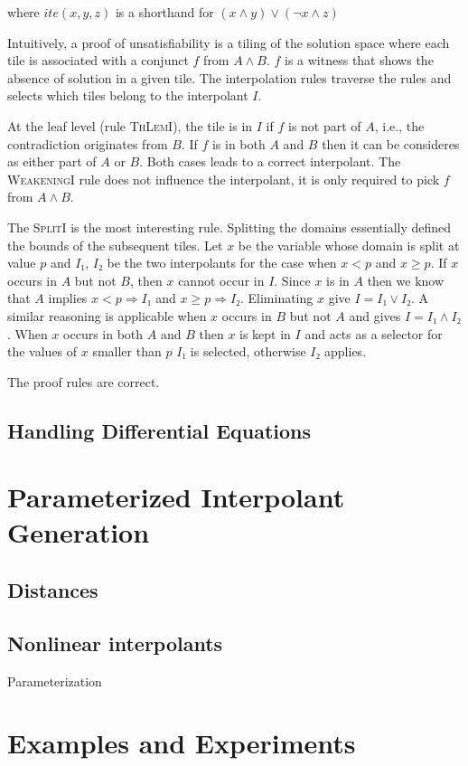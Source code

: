 \documentclass{llncs}
\begin{document}
where $ite(x,y,z)$ is a shorthand for $(x ∧ y)∨(¬x ∧ z)$


Intuitively, a proof of unsatisfiability is a tiling of the solution space where each tile is associated with a conjunct $f$ from $A ∧ B$.
$f$ is a witness that shows the absence of solution in a given tile.
The interpolation rules traverse the rules and selects which tiles belong to the interpolant $I$.

At the leaf level (rule \textsc{ThLemI}), the tile is in $I$ if $f$ is not part of $A$, i.e., the contradiction originates from $B$.
If $f$ is in both $A$ and $B$ then it can be consideres as either part of $A$ or $B$.
Both cases leads to a correct interpolant.
The \textsc{WeakeningI} rule does not influence the interpolant, it is only required to pick $f$ from $A ∧ B$.

The \textsc{SplitI} is the most interesting rule.
Splitting the domains essentially defined the bounds of the subsequent tiles.
Let $x$ be the variable whose domain is split at value $p$ and $I₁$, $I₂$ be the two interpolants for the case when $x < p$ and $x ≥ p$.
If $x$ occurs in $A$ but not $B$, then $x$ cannot occur in $I$.
Since $x$ is in $A$ then we know that $A$ implies $x < p ⇒ I₁$ and $x ≥ p ⇒ I₂$.
Eliminating $x$ give $I = I₁ ∨ I₂$.
A similar reasoning is applicable when $x$ occurs in $B$ but not $A$ and gives $I = I₁ ∧ I₂$.
When $x$ occurs in both $A$ and $B$ then $x$ is kept in $I$ and acts as a selector for the values of $x$ smaller than $p$ $I₁$ is selected, otherwise $I₂$ applies.

\begin{theorem}
The proof rules are correct. 
\end{theorem}




\subsection{Handling Differential Equations}

\section{Parameterized Interpolant Generation}

\subsection{Distances}

\subsection{Nonlinear interpolants}

Parameterization 


\section{Examples and Experiments}


\end{document}
